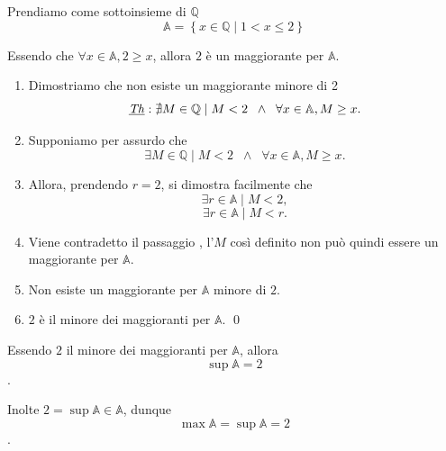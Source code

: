 \begin{example} \leavevmode

    \begin{list_3}
        \item Prendiamo come sottoinsieme di $\mathbb{Q}$
        \[ \mathbb{A} = \left\{ x \in \mathbb{Q} \mid 1 < x \leq 2 \right\} \]
        \item Essendo che $\forall x \in \mathbb{A}, 2 \geq x$, allora $2$ è un maggiorante per $\mathbb{A}$.
        \begin{enumerate}[label=\arabic*.]
            \item Dimostriamo che non esiste un maggiorante minore di 2
            \[ \underbar{\textit{Th}}: \nexists M \in \mathbb{Q} \mid M < 2 \;\;\land\;\; \forall x \in \mathbb{A}, M \geq x .\]
            \item \label{pas:esi-mag/1} Supponiamo per assurdo che
            \[ \exists M \in \mathbb{Q} \mid M < 2 \;\;\land\;\;  \forall x \in \mathbb{A}, M \geq x .\]
            \item Allora, prendendo $r = 2$, si dimostra facilmente che
            \[ \exists r \in \mathbb{A} \mid M < 2,\]
            \[ \exists r \in \mathbb{A} \mid M < r.\]
            \item Viene contradetto il passaggio , l'$M$ così definito non può
            quindi essere un maggiorante per $\mathbb{A}$.
            \item Non esiste un maggiorante per $\mathbb{A}$ minore di $2$.
            \item $2$ è il minore dei maggioranti per $\mathbb{A}$.
            \qed
        \end{enumerate}
        \item Essendo $2$ il minore dei maggioranti per $\mathbb{A}$, allora
        \[ \sup\mathbb{A} = 2 \].
        \item Inolte $2 = \sup\mathbb{A} \in \mathbb{A}$, dunque
        \[ \max\mathbb{A} = \sup\mathbb{A} = 2 \].


\end{list_3}
\end{example}

